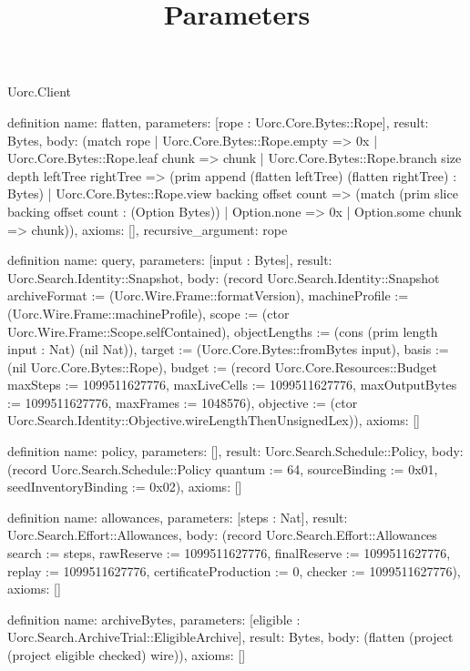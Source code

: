 \begin{lexlean}{Uorc.Client}
\title{Parameters}
\begin{semanticmodule}
definition{
  name: flatten,
  parameters: [rope : Uorc.Core.Bytes::Rope],
  result: Bytes,
  body: (match rope
    | Uorc.Core.Bytes::Rope.empty => 0x
    | Uorc.Core.Bytes::Rope.leaf chunk => chunk
    | Uorc.Core.Bytes::Rope.branch size depth leftTree rightTree => (prim append (flatten leftTree) (flatten rightTree) : Bytes)
    | Uorc.Core.Bytes::Rope.view backing offset count => (match (prim slice backing offset count : (Option Bytes))
      | Option.none => 0x
      | Option.some chunk => chunk)),
  axioms: [],
  recursive_argument: rope
}

definition{
  name: query,
  parameters: [input : Bytes],
  result: Uorc.Search.Identity::Snapshot,
  body: (record Uorc.Search.Identity::Snapshot {archiveFormat := (Uorc.Wire.Frame::formatVersion), machineProfile := (Uorc.Wire.Frame::machineProfile), scope := (ctor Uorc.Wire.Frame::Scope.selfContained), objectLengths := (cons (prim length input : Nat) (nil Nat)), target := (Uorc.Core.Bytes::fromBytes input), basis := (nil Uorc.Core.Bytes::Rope), budget := (record Uorc.Core.Resources::Budget {maxSteps := 1099511627776, maxLiveCells := 1099511627776, maxOutputBytes := 1099511627776, maxFrames := 1048576}), objective := (ctor Uorc.Search.Identity::Objective.wireLengthThenUnsignedLex)}),
  axioms: []
}

definition{
  name: policy,
  parameters: [],
  result: Uorc.Search.Schedule::Policy,
  body: (record Uorc.Search.Schedule::Policy {quantum := 64, sourceBinding := 0x01, seedInventoryBinding := 0x02}),
  axioms: []
}

definition{
  name: allowances,
  parameters: [steps : Nat],
  result: Uorc.Search.Effort::Allowances,
  body: (record Uorc.Search.Effort::Allowances {search := steps, rawReserve := 1099511627776, finalReserve := 1099511627776, replay := 1099511627776, certificateProduction := 0, checker := 1099511627776}),
  axioms: []
}

definition{
  name: archiveBytes,
  parameters: [eligible : Uorc.Search.ArchiveTrial::EligibleArchive],
  result: Bytes,
  body: (flatten (project (project eligible checked) wire)),
  axioms: []
}


\end{semanticmodule}
\end{lexlean}
